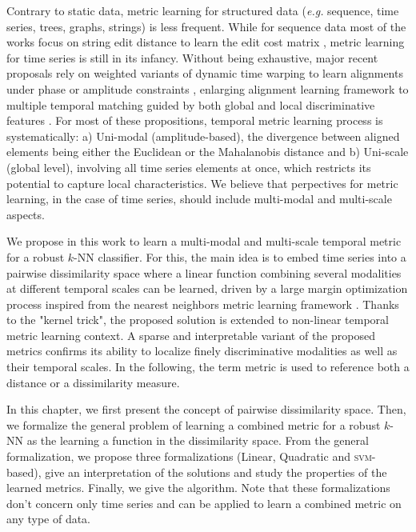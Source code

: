 Contrary to static data, metric learning for structured data (\textit{e.g.} sequence, time series, trees, graphs, strings) is less frequent. While for sequence data most of the works focus on string edit distance to learn the edit cost matrix \cite{Oncina2006,Bellet2012}, metric learning for time series is still in its infancy. Without being exhaustive, major recent proposals rely on weighted variants of dynamic time warping to learn alignments under phase or amplitude constraints \cite{Reyes2011,Jeong2011,ZhangX.-L.Z.-G.Luo2014}, enlarging alignment learning framework to multiple temporal matching guided by both global and local discriminative features \cite{Frambourg2013a}. For most of these propositions, temporal metric learning process is systematically: a) Uni-modal (amplitude-based), the divergence between aligned elements being either the Euclidean or the Mahalanobis distance and b) Uni-scale (global level), involving all time series elements at once, which restricts its potential to capture local characteristics. We believe that perpectives for metric learning, in the case of time series, should include multi-modal and multi-scale aspects.

We propose in this work to learn a multi-modal and multi-scale temporal metric for a robust $k$-NN classifier. For this, the main idea is to embed time series into a pairwise dissimilarity space where a linear function combining several modalities at different temporal scales can be learned, driven by a large margin optimization process inspired from the nearest neighbors metric learning framework \cite{Weinberger2009a} . Thanks to the "kernel trick", the proposed solution is extended to non-linear temporal metric learning context. A sparse and interpretable variant of the proposed metrics confirms its ability to localize finely discriminative modalities as well as their temporal scales. In the following, the term metric is used to reference both a distance or a dissimilarity measure.

In this chapter, we first present the concept of pairwise dissimilarity space. Then, we formalize the general problem of learning a combined metric for a robust $k$-NN as the learning a function in the dissimilarity space. From the general formalization, we propose three formalizations (Linear, Quadratic and \textsc{svm}-based), give an interpretation of the solutions and study the properties of the learned metrics. Finally, we give the algorithm. Note that these formalizations don't concern only time series and can be applied to learn a combined metric on any type of data. 


